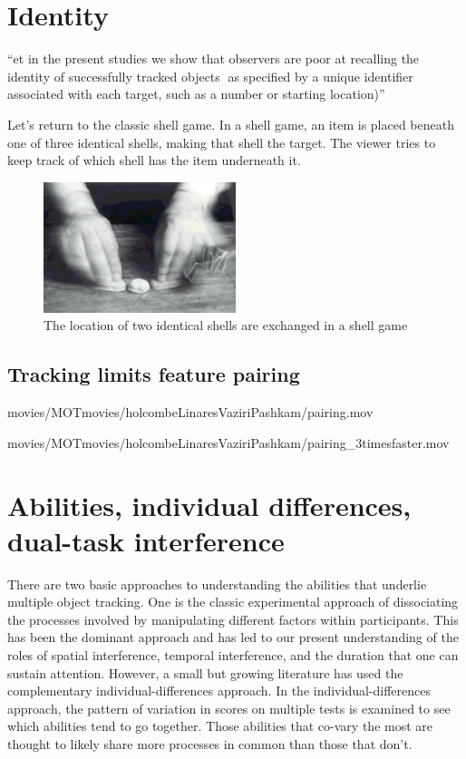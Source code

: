 \documentclass[]{book}
\begin{document}
\hypertarget{identity}{%
\chapter{Identity}\label{identity}}

\citet{pylyshynPuzzlingFindingsMultiple2004} ``et in the present studies we show that observers are poor at recalling the identity of successfully tracked objects 􏰞as specified by a unique identifier associated with each target, such as a number or starting location)''

Let's return to the classic shell game. In a shell game, an item is placed beneath one of three identical shells, making that shell the target. The viewer tries to keep track of which shell has the item underneath it.

\begin{figure}
\centering
\includegraphics[width=0.5\textwidth,height=\textheight]{imagesForRmd/shellGame.png}
\caption{The location of two identical shells are exchanged in a shell game}
\end{figure}

\hypertarget{tracking-limits-feature-pairing}{%
\section{Tracking limits feature pairing}\label{tracking-limits-feature-pairing}}

movies/MOTmovies/holcombeLinaresVaziriPashkam/pairing.mov

movies/MOTmovies/holcombeLinaresVaziriPashkam/pairing\_3timesfaster.mov

\hypertarget{abilities-individual-differences-dual-task-interference}{%
\chapter{Abilities, individual differences, dual-task interference}\label{abilities-individual-differences-dual-task-interference}}

There are two basic approaches to understanding the abilities that underlie multiple object tracking. One is the classic experimental approach of dissociating the processes involved by manipulating different factors within participants. This has been the dominant approach and has led to our present understanding of the roles of spatial interference, temporal interference, and the duration that one can sustain attention. However, a small but growing literature has used the complementary individual-differences approach. In the individual-differences approach, the pattern of variation in scores on multiple tests is examined to see which abilities tend to go together. Those abilities that co-vary the most are thought to likely share more processes in common than those that don't.
\end{document}
